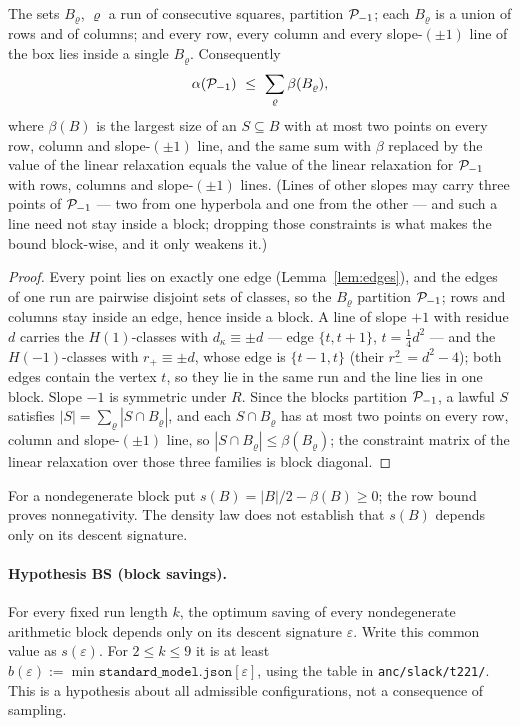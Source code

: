 \begin{theorem}\label{thm:blocks}
The sets $B_\varrho$, $\varrho$ a run of consecutive squares, partition $\mathcal{P}_{-1}$; each $B_\varrho$ is a union of rows and of columns;
and every row, every column and every slope-$(\pm1)$ line of the box lies inside a single $B_\varrho$.  Consequently
\begin{equation}\label{eq:blocks}
 \alpha(\mathcal{P}_{-1})\ \le\ \sum_{\varrho}\beta(B_\varrho),
\end{equation}
where $\beta(B)$ is the largest size of an $S\subseteq B$ with at most two points on every row, column and slope-$(\pm1)$ line,
and the same sum with $\beta$ replaced by the value of the linear relaxation equals the value of the linear relaxation for
$\mathcal{P}_{-1}$ with rows, columns and slope-$(\pm1)$ lines.  (Lines of other slopes may carry three points of $\mathcal{P}_{-1}$ --- two from one
hyperbola and one from the other --- and such a line need not stay inside a block; dropping those constraints is what makes the bound
block-wise, and it only weakens it.)
\end{theorem}
\begin{proof}
Every point lies on exactly one edge (Lemma~\ref{lem:edges}), and the edges of one run are pairwise disjoint sets of classes, so the
$B_\varrho$ partition $\mathcal{P}_{-1}$; rows and columns stay inside an edge, hence inside a block.  A line of slope $+1$ with residue $d$
carries the $H(1)$-classes with $d_\kappa\equiv\pm d$ --- edge $\{t,t+1\}$, $t=\tfrac14d^2$ --- and the $H(-1)$-classes with $r_+\equiv\pm d$,
whose edge is $\{t-1,t\}$ (their $r_-^2=d^2-4$); both edges contain the vertex $t$, so they lie in the same run and the line lies in one
block.  Slope $-1$ is symmetric under $R$.  Since the blocks partition $\mathcal{P}_{-1}$, a lawful $S$ satisfies
$|S|=\sum_\varrho|S\cap B_\varrho|$, and each $S\cap B_\varrho$ has at most two points on every row, column and slope-$(\pm1)$ line, so
$|S\cap B_\varrho|\le\beta(B_\varrho)$; the constraint matrix of the linear relaxation over those three families is block diagonal.
\end{proof}



For a nondegenerate block put $s(B)=|B|/2-\beta(B)\ge0$; the row bound proves nonnegativity.
The density law does not establish that $s(B)$ depends only on its descent signature.

\paragraph{Hypothesis BS (block savings).}\label{hyp:block}
For every fixed run length $k$, the optimum saving of every nondegenerate arithmetic block depends only on its descent signature $\varepsilon$.
Write this common value as $s(\varepsilon)$.  For $2\le k\le9$ it is at least
$b(\varepsilon):=\min \texttt{standard\_model.json}[\varepsilon]$, using the table in \texttt{anc/slack/t221/}.
This is a hypothesis about all admissible configurations, not a consequence of sampling.

